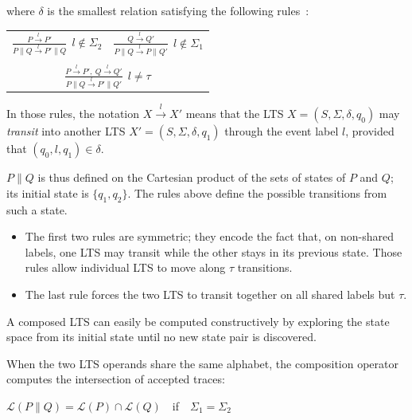 \noindent where $\delta$ is the smallest relation satisfying the following rules~\cite{Giannakopoulou:1999}:

\begin{center}
\begin{tabular}{cc}
$\frac{\displaystyle P \stackrel{l}{\longrightarrow} P'}{\displaystyle P \parallel Q \stackrel{l}{\longrightarrow} P' \parallel Q}~~l \notin \Sigma_2$ &
$\frac{\displaystyle Q \stackrel{l}{\longrightarrow} Q'}{\displaystyle P \parallel Q \stackrel{l}{\longrightarrow} P \parallel Q'}~~l \notin \Sigma_1$ \\
 & \\
\multicolumn{2}{c}{$\frac{\displaystyle P \stackrel{l}{\longrightarrow} P',~Q \stackrel{l}{\longrightarrow} Q'}{\displaystyle P \parallel Q \stackrel{l}{\longrightarrow} P' \parallel Q'}~~l \neq \tau$} \\
\end{tabular}
\end{center}

In those rules, the notation $X \stackrel{l}{\longrightarrow} X'$ means that the LTS $X = (S,\Sigma,\delta,q_0)$ may \emph{transit} into another LTS $X' = (S,\Sigma,\delta,q_1)$ through the event label $l$, provided that $(q_0,l,q_1) \in \delta$. 

$P \parallel Q$ is thus defined on the Cartesian product of the sets of states of $P$ and $Q$; its initial state is $\{q_1,q_2\}$. The rules above define the possible transitions from such a state. 

\begin{itemize}
\item The first two rules are symmetric; they encode the fact that, on non-shared labels, one LTS may transit while the other stays in its previous state. Those rules allow individual LTS to move along $\tau$ transitions. 
\item The last rule forces the two LTS to transit together on all shared labels but $\tau$.
\end{itemize}

A composed LTS can easily be computed constructively by exploring the state space from its initial state until no new state pair is discovered. 

When the two LTS operands share the same alphabet, the composition operator computes the intersection of accepted traces:

\begin{center}
$\mathcal{L}(P \parallel Q) = \mathcal{L}(P) \cap \mathcal{L}(Q)$~~if~~$\Sigma_{1}=\Sigma_{2}$
\end{center}

